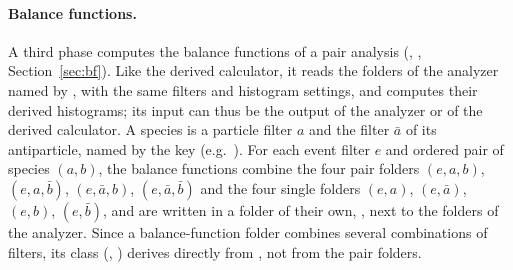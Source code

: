 \paragraph{Balance functions.}
A third phase computes the balance functions of a pair analysis (,
, Section~\ref{sec:bf}). Like the derived calculator, it reads the folders of the
analyzer named by , with the same filters and histogram settings, and computes their derived
histograms; its input can thus be the output of the analyzer or of the derived calculator. A species is a particle
filter $a$ and the filter $\bar a$ of its antiparticle, named by the key 
(e.g.\ ). For each event filter $e$ and ordered pair of species $(a,b)$, the balance functions
combine the four pair folders $(e,a,b)$, $(e,a,\bar b)$, $(e,\bar a,b)$, $(e,\bar a,\bar b)$ and the four single
folders $(e,a)$, $(e,\bar a)$, $(e,b)$, $(e,\bar b)$, and are written in a folder of their own,
, next to the folders of the analyzer. Since a balance-function folder combines several
combinations of filters, its class (, ) derives directly from
, not from the pair folders.

